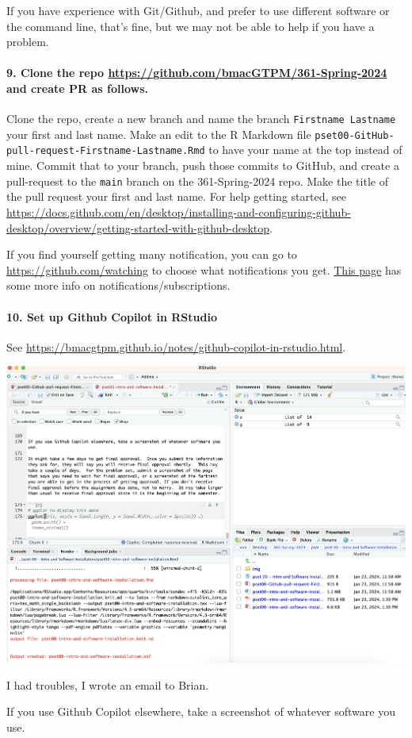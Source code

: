 \documentclass[
]{article}
\begin{document}
If you have experience with Git/Github, and prefer to use different
software or the command line, that's fine, but we may not be able to
help if you have a problem.

\hypertarget{clone-the-repo-httpsgithub.combmacgtpm361-spring-2024-and-create-pr-as-follows.}{%
\paragraph{\texorpdfstring{9. Clone the repo
\url{https://github.com/bmacGTPM/361-Spring-2024} and create PR as
follows.}{9. Clone the repo https://github.com/bmacGTPM/361-Spring-2024 and create PR as follows.}}\label{clone-the-repo-httpsgithub.combmacgtpm361-spring-2024-and-create-pr-as-follows.}}

Clone the repo, create a new branch and name the branch
\texttt{Firstname\ Lastname} your first and last name. Make an edit to
the R Markdown file
\texttt{pset00-GitHub-pull-request-Firstname-Lastname.Rmd} to have your
name at the top instead of mine. Commit that to your branch, push those
commits to GitHub, and create a pull-request to the \texttt{main} branch
on the 361-Spring-2024 repo. Make the title of the pull request your
first and last name. For help getting started, see
\url{https://docs.github.com/en/desktop/installing-and-configuring-github-desktop/overview/getting-started-with-github-desktop}.

If you find yourself getting many notification, you can go to
\url{https://github.com/watching} to choose what notifications you get.
\href{https://docs.github.com/en/account-and-profile/managing-subscriptions-and-notifications-on-github/managing-subscriptions-for-activity-on-github/managing-your-subscriptions}{This
page} has some more info on notifications/subscriptions.

\hypertarget{set-up-github-copilot-in-rstudio}{%
\paragraph{10. Set up Github Copilot in
RStudio}\label{set-up-github-copilot-in-rstudio}}

See
\url{https://bmacgtpm.github.io/notes/github-copilot-in-rstudio.html}.

\includegraphics{img/snip of GitHub Copilot.png}

I had troubles, I wrote an email to Brian.

If you use Github Copilot elsewhere, take a screenshot of whatever
software you use.
\end{document}

